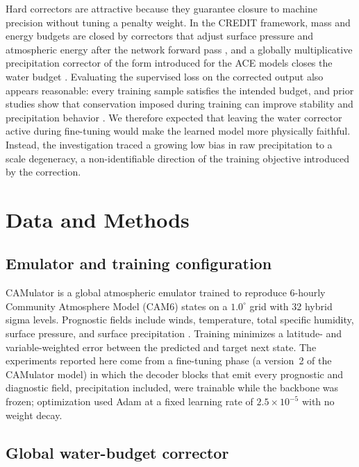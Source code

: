 \documentclass{ametsocV6.1}
\begin{document}
Hard correctors are attractive because they guarantee closure to machine precision without tuning a penalty weight. In the CREDIT framework, mass and energy budgets are closed by correctors that adjust surface pressure and atmospheric energy after the network forward pass \citep{schreck2025,sha2025}, and a globally multiplicative precipitation corrector of the form introduced for the ACE models closes the water budget \citep{wattmeyer2023ace,wattmeyer2025}. Evaluating the supervised loss on the corrected output also appears reasonable: every training sample satisfies the intended budget, and prior studies show that conservation imposed during training can improve stability and precipitation behavior \citep{wattmeyer2025,sha2025}. We therefore expected that leaving the water corrector active during fine-tuning would make the learned model more physically faithful. Instead, the investigation traced a growing low bias in raw precipitation to a scale degeneracy, a non-identifiable direction of the training objective introduced by the correction.

\section{Data and Methods}\label{sec:methods}

\subsection{Emulator and training configuration}\label{sec:setup}

CAMulator \citep{chapman2025camulator} is a global atmospheric emulator trained to reproduce 6-hourly Community Atmosphere Model (CAM6) states on a $1.0^\circ$ grid with 32 hybrid sigma levels. Prognostic fields include winds, temperature, total specific humidity, surface pressure, and surface precipitation \citep[see][for full details]{chapman2025camulator}. Training minimizes a latitude- and variable-weighted error between the predicted and target next state. The experiments reported here come from a fine-tuning phase (a version~2 of the CAMulator model) in which the decoder blocks that emit every prognostic and diagnostic field, precipitation included, were trainable while the backbone was frozen; optimization used Adam at a fixed learning rate of $2.5\times10^{-5}$ with no weight decay.

\subsection{Global water-budget corrector}
\end{document}
